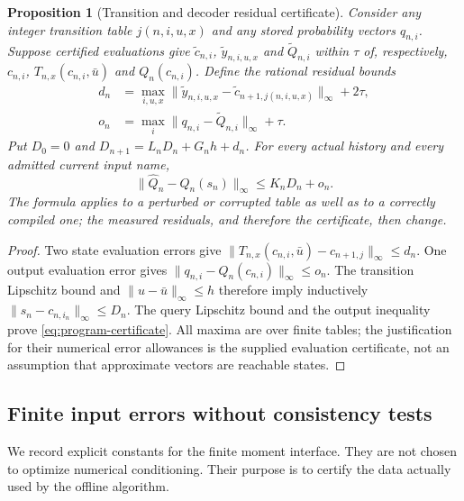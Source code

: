 \documentclass[11pt]{amsart}
\newtheorem{proposition}[theorem]{Proposition}
\theoremstyle{definition}\newtheorem{definition}[theorem]{Definition}
\theoremstyle{remark}\newtheorem{remark}[theorem]{Remark}
\begin{document}
\begin{proposition}[Transition and decoder residual certificate]
\label{prop:program-certificate}
Consider any integer transition table $j(n,i,u,x)$ and any stored
probability vectors $q_{n,i}$. Suppose certified evaluations give
$\widetilde c_{n,i}$, $\widetilde y_{n,i,u,x}$ and
$\widetilde Q_{n,i}$ within $\tau$ of, respectively,
$c_{n,i}$, $T_{n,x}(c_{n,i},\bar u)$ and $Q_n(c_{n,i})$.
Define the rational residual bounds
\begin{align*}
 d_n&=\max_{i,u,x}
  \|\widetilde y_{n,i,u,x}-\widetilde c_{n+1,j(n,i,u,x)}\|_\infty
       +2\tau,\\
 o_n&=\max_i\|q_{n,i}-\widetilde Q_{n,i}\|_\infty+\tau.
\end{align*}
Put $D_0=0$ and $D_{n+1}=L_nD_n+G_nh+d_n$. For every actual
history and every admitted current input name,
\begin{equation}\label{eq:program-certificate}
 \|\widehat Q_n-Q_n(s_n)\|_\infty\le K_nD_n+o_n.
\end{equation}
The formula applies to a perturbed or corrupted table as well as to a
correctly compiled one; the measured residuals, and therefore the
certificate, then change.
\end{proposition}
\begin{proof}
Two state evaluation errors give
$\|T_{n,x}(c_{n,i},\bar u)-c_{n+1,j}\|_\infty\le d_n$.
One output evaluation error gives
$\|q_{n,i}-Q_n(c_{n,i})\|_\infty\le o_n$.
The transition Lipschitz bound and $\|u-\bar u\|_\infty\le h$
therefore imply inductively
$\|s_n-c_{n,i_n}\|_\infty\le D_n$. The query Lipschitz bound and
the output inequality prove \eqref{eq:program-certificate}. All
maxima are over finite tables; the justification for their numerical
error allowances is the supplied evaluation certificate, not an
assumption that approximate vectors are reachable states.
\end{proof}

\subsection{Finite input errors without consistency tests}
We record explicit constants for the finite moment interface. They are
not chosen to optimize numerical conditioning. Their purpose is to
certify the data actually used by the offline algorithm.
\end{document}
